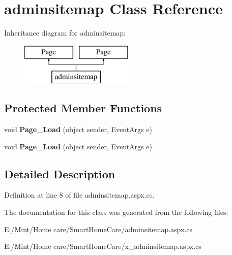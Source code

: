 \hypertarget{classadminsitemap}{\section{adminsitemap Class Reference}
\label{classadminsitemap}
}
Inheritance diagram for adminsitemap\-:\begin{figure}[H]
\begin{center}
\leavevmode
\includegraphics[height=2.000000cm]{classadminsitemap}
\end{center}
\end{figure}
\subsection*{Protected Member Functions}
\begin{DoxyCompactItemize}
\item 
\hypertarget{classadminsitemap_a124c8997fd52c92c75866852a1586fb3}{void {\bfseries Page\-\_\-\-Load} (object sender, Event\-Args e)}\label{classadminsitemap_a124c8997fd52c92c75866852a1586fb3}

\item 
\hypertarget{classadminsitemap_a124c8997fd52c92c75866852a1586fb3}{void {\bfseries Page\-\_\-\-Load} (object sender, Event\-Args e)}\label{classadminsitemap_a124c8997fd52c92c75866852a1586fb3}

\end{DoxyCompactItemize}


\subsection{Detailed Description}


Definition at line 8 of file adminsitemap.\-aspx.\-cs.



The documentation for this class was generated from the following files\-:\begin{DoxyCompactItemize}
\item 
E\-:/\-Mint/\-Home care/\-Smart\-Home\-Care/adminsitemap.\-aspx.\-cs\item 
E\-:/\-Mint/\-Home care/\-Smart\-Home\-Care/x\-\_\-adminsitemap.\-aspx.\-cs\end{DoxyCompactItemize}

